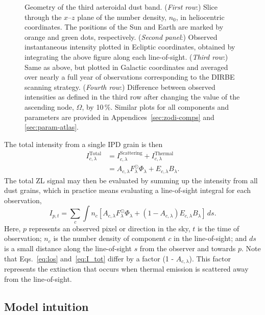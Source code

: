 \documentclass[twocolumn]{aa}
\begin{document}
\begin{figure}
  \caption{Geometry of the third asteroidal dust band. (\textit{First row}:)
    Slice through the $x$--$z$ plane of the number density, $n_{0}$,
    in heliocentric coordinates. The positions of the Sun and Earth
    are marked by orange and green dots, respectively. (\textit{Second
    panel}:) Observed instantaneous intensity plotted in Ecliptic
    coordinates, obtained by integrating the above figure along each
    line-of-sight. (\textit{Third row}:) Same as above, but plotted in
  Galactic coordinates and averaged over nearly a full year of
  observations corresponding to the DIRBE scanning strategy. 
  (\textit{Fourth row}:) Difference between observed
  intensities as defined in the third row after changing the value of
  the ascending node, $\Omega$, by 10\,\%. Similar plots for all
  components and parameters are provided in 
  Appendices~\ref{sec:zodi-comps} and \ref{sec:param-atlas}.}
  \label{fig:band3}
\end{figure}

The total intensity from a single IPD grain is then
\begin{align}\label{eq:I_tot}
    I^\mathrm{Total}_{c, \lambda} &= I^\mathrm{Scattering}_{c,\lambda} + I^\mathrm{Thermal}_{c,\lambda}\\
    &= A_{c, \lambda} F_\lambda^\odot \Phi_\lambda + E_{c,\lambda} B_\lambda.
\end{align}
The total ZL signal may then be evaluated by summing up the intensity
from all dust grains, which in practice means evaluating a line-of-sight 
integral for each observation,
\begin{equation}\label{eq:los}
    I_{p,t} = \sum_c \int n_c \left[  A_{c, \lambda} F_\lambda^\odot \Phi_\lambda + \left( 1 - A_{c, \lambda} \right) E_{c,\lambda} B_\lambda \right]\,ds.
\end{equation}
Here, $p$ represents an observed pixel or direction in the sky, $t$ is
the time of observation; $n_c$ is the number density of component $c$
in the line-of-sight; and $ds$ is a small distance along the
line-of-sight $s$ from the observer and towards $p$. Note that
Eqs.~\eqref{eq:los} and~\eqref{eq:I_tot} differ by a factor (1 -
$A_{c, \lambda}$). This factor represents the extinction that occurs
when thermal emission is scattered away from the line-of-sight.

\subsection{Model intuition}
\end{document}
